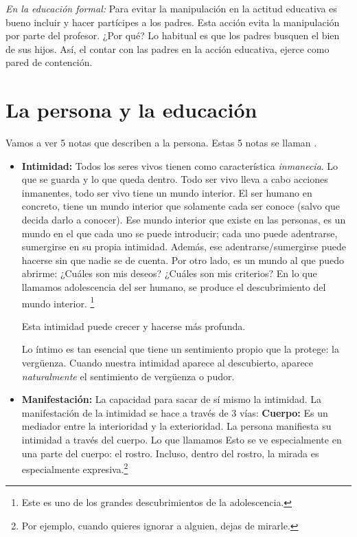 \documentclass[palatino]{apuntesURJC}
\begin{document}
\textit{En la educación formal:}
Para evitar la manipulación en la actitud educativa es bueno incluir y hacer partícipes a los padres.
%
Esta acción evita la manipulación por parte del profesor. ¿Por qué?
%
Lo habitual es que los padres busquen el bien de sus hijos. Así, el contar con las padres en la acción educativa, ejerce como pared de contención.


\section{La persona y la educación}

Vamos a ver 5 notas que describen a la persona. Estas 5 notas se llaman .

\begin{itemize}
	\item \textbf{Intimidad:} Todos los seres vivos tienen como característica \textit{inmanecia}.
	Lo que se guarda y lo que queda dentro.
	Todo ser vivo lleva a cabo acciones inmanentes, todo ser vivo tiene un mundo interior.
	El ser humano en concreto, tiene un mundo interior que solamente cada ser conoce (salvo que decida darlo a conocer).
	Ese mundo interior que existe en las personas, es un mundo en el que cada uno se puede introducir; cada uno puede adentrarse, sumergirse en su propia intimidad.
	Además, ese adentrarse/sumergirse puede hacerse sin que nadie se de cuenta.
	Por otro lado, es un mundo al que puedo abrirme: ¿Cuáles son mis deseos? ¿Cuáles son mis criterios?
	En lo que llamamos adolescencia del ser humano, se produce el descubrimiento del mundo interior. \footnote{Este es uno de los grandes descubrimientos de la adolescencia.}

	\subitem Esta intimidad puede crecer y hacerse más profunda.

	\subitem Lo íntimo es tan esencial que tiene un sentimiento propio que la protege: la vergüenza.
	Cuando nuestra intimidad aparece al descubierto, aparece \textit{naturalmente} el sentimiento de vergüenza o pudor.

	\item \textbf{Manifestación:} La capacidad para sacar de sí mismo la intimidad.
	La manifestación de la intimidad se hace a través de 3 vías:
	\subitem \textbf{Cuerpo: } Es un mediador entre la interioridad y la exterioridad. La persona manifiesta su intimidad a través del cuerpo.
	Lo que llamamos 
	Esto se ve especialmente en una parte del cuerpo: el rostro.
	Incluso, dentro del rostro, la mirada es especialmente expresiva.\footnote{Por ejemplo, cuando quieres ignorar a alguien, dejas de mirarle.}



\end{itemize}
\end{document}
